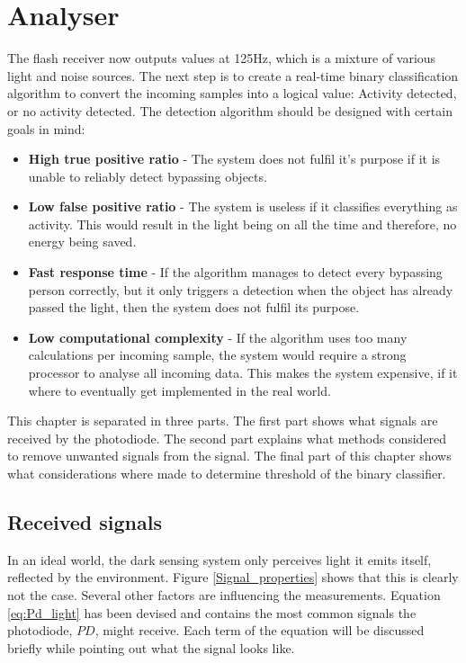 \chapter{Analyser}
\label{chp:Analyser}
The flash receiver now outputs values at 125Hz, which is a mixture of various light and noise sources. The next step is to create a real-time binary classification algorithm to convert the incoming samples into a logical value: Activity detected, or no activity detected. The detection algorithm should be designed with certain goals in mind:
\begin{itemize}[itemsep=-1ex]
	\item \textbf{High true positive ratio} - The system does not fulfil it's purpose if it is unable to reliably detect bypassing objects.
	\item \textbf{Low false positive ratio} - The system is useless if it classifies everything as activity. This would result in the light being on all the time and therefore, no energy being saved.
	\item \textbf{Fast response time} - If the algorithm manages to detect every bypassing person correctly, but it only triggers a detection when the object has already passed the light, then the system does not fulfil its purpose.
	\item \textbf{Low computational complexity} - If the algorithm uses too many calculations per incoming sample, the system would require a strong processor to analyse all incoming data. This makes the system expensive, if it where to eventually get implemented in the real world.
\end{itemize}
This chapter is separated in three parts. The first part shows what signals are received by the photodiode. The second part explains what methods considered to remove unwanted signals from the signal. The final part of this chapter shows what considerations where made to determine threshold of the binary classifier.

\section{Received signals}
\label{receivedsignals}
In an ideal world, the dark sensing system only perceives light it emits itself, reflected by the environment. Figure \ref{Signal_properties} shows that this is clearly not the case. Several other factors are influencing the measurements. Equation \ref{eq:Pd_light} has been devised and contains the most common signals the photodiode, $PD$, might receive. Each term of the equation will be discussed briefly while pointing out what the signal looks like.

